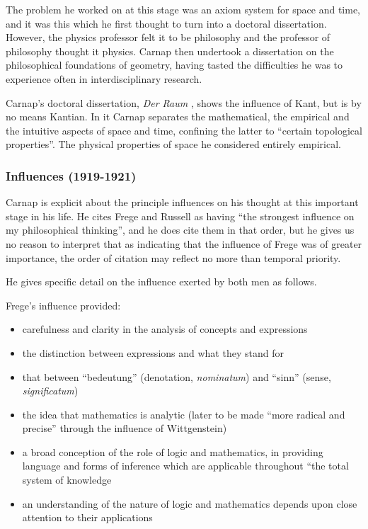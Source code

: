 \documentclass[10pt,titlepage]{book}
\begin{document}
The problem he worked on at this stage was an axiom system for space and time, and it was this which he first thought to turn into a doctoral dissertation.
However, the physics professor felt it to be philosophy and the professor of philosophy thought it physics.
Carnap then undertook a dissertation on the philosophical foundations of geometry, having tasted the difficulties he was to experience often in interdisciplinary research.

Carnap's doctoral dissertation, \emph{Der Raum} \cite{carnap21}, shows the influence of Kant, but is by no means Kantian.
In it Carnap separates the mathematical, the empirical and the intuitive aspects of space and time, confining the latter to ``certain topological properties''.
The physical properties of space he considered entirely empirical.

\subsubsection{Influences (1919-1921)}

Carnap is explicit about the principle influences on his thought at this important stage in his life.
He cites Frege and Russell as having ``the strongest influence on my philosophical thinking'', and he does cite them in that order, but he gives us no reason to interpret that as indicating that the influence of Frege was of greater importance, the order of citation may reflect no more than temporal priority.

He gives specific detail on the influence exerted by both men as follows.

Frege's influence provided:
\begin{itemize}
\item carefulness and clarity in the analysis of concepts and expressions
\item the distinction between expressions and what they stand for
\item that between ``bedeutung'' (denotation, \emph{nominatum}) and ``sinn'' (sense, \emph{significatum})
\item the idea that mathematics is analytic (later to be made ``more radical and precise'' through the influence of Wittgenstein)
\item a broad conception of the role of logic and mathematics, in providing language and forms of inference which are applicable throughout ``the total system of knowledge
\item an understanding of the nature of logic and mathematics depends upon close attention to their applications
\end{itemize}
\end{document}

